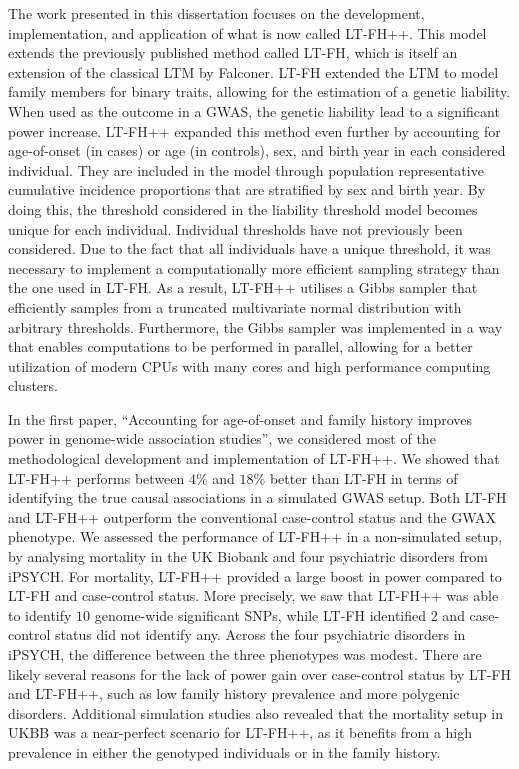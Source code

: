 The work presented in this dissertation focuses on the development, implementation, and application of what is now called LT-FH++. This model extends the previously published method called LT-FH, which is itself an extension of the classical LTM by Falconer\cite{falconer1965inheritance,falconer1967inheritance}. LT-FH extended the LTM to model family members for binary traits, allowing for the estimation of a genetic liability. When used as the outcome in a GWAS, the genetic liability lead to a significant power increase. LT-FH++ expanded this method even further by accounting for age-of-onset (in cases) or age (in controls), sex, and birth year in each considered individual. They are included in the model through population representative cumulative incidence proportions that are stratified by sex and birth year. By doing this, the threshold considered in the liability threshold model becomes unique for each individual. Individual thresholds have not previously been considered. Due to the fact that all individuals have a unique threshold, it was necessary to implement a computationally more efficient sampling strategy than the one used in LT-FH. As a result, LT-FH++ utilises a Gibbs sampler that efficiently samples from a truncated multivariate normal distribution with arbitrary thresholds. Furthermore, the Gibbs sampler was implemented in a way that enables computations to be performed in parallel, allowing for a better utilization of modern CPUs with many cores and high performance computing clusters.

In the first paper, \enquote{Accounting for age-of-onset and family history improves power in genome-wide association studies}\cite{pedersen2022accounting}, we considered most of the methodological development and implementation of LT-FH++. We showed that LT-FH++ performs between $ 4\% $ and $ 18\% $ better than LT-FH in terms of identifying the true causal associations in a simulated GWAS setup. Both LT-FH and LT-FH++ outperform the conventional case-control status and the GWAX phenotype. We assessed the performance of LT-FH++ in a non-simulated setup, by analysing mortality in the UK Biobank and four psychiatric disorders from iPSYCH. For mortality, LT-FH++ provided a large boost in power compared to LT-FH and case-control status. More precisely, we saw that LT-FH++ was able to identify $ 10 $ genome-wide significant SNPs, while LT-FH identified $ 2 $ and case-control status did not identify any. Across the four psychiatric disorders in iPSYCH, the difference between the three phenotypes was modest. There are likely several reasons for the lack of power gain over case-control status by LT-FH and LT-FH++, such as low family history prevalence and more polygenic disorders. Additional simulation studies also revealed that the mortality setup in UKBB was a near-perfect scenario for LT-FH++, as it benefits from a high prevalence in either the genotyped individuals or in the family history.

